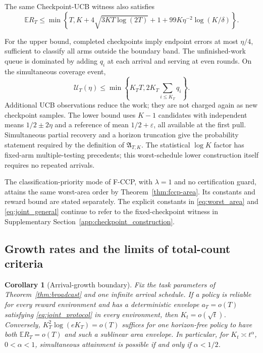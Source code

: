 \documentclass[11pt]{article}
\newtheorem{corollary}[theorem]{Corollary}
\theoremstyle{remark}
\newcommand{\E}{\mathbb E}
\begin{document}
The same Checkpoint-UCB witness also satisfies
\begin{equation}
 \E R_T\le\min\left\{T,K+4\sqrt{3KT\log(2T)}+1+
                         99K\eta^{-2}\log(K/\delta)\right\}.
 \label{eq:joint_general}
\end{equation}


For the upper bound, completed checkpoints imply endpoint errors at most
$\eta/4$, sufficient to classify all arms outside the boundary band. The
unfinished-work queue is dominated by adding $q_i$ at each arrival and serving
at even rounds. On the simultaneous coverage event,
\begin{equation}
 \mathcal U_T(\eta)\le\min\left\{K_TT,
                         2K_T\sum_{i\le K_T}q_i\right\}.
 \label{eq:queue_upper}
\end{equation}
Additional UCB observations reduce the work; they are not charged again as
new checkpoint samples. The lower bound uses $K-1$ candidates with independent
means $1/2\pm2\eta$ and a reference of mean $1/2+\varepsilon$, all available
at the first pull. Simultaneous partial recovery and a horizon truncation give
the probability statement required by the definition of $\mathfrak A_{T,K}$.
The statistical $\log K$ factor has fixed-arm multiple-testing precedents;
this worst-schedule lower construction itself requires no repeated arrivals.

The classification-priority mode of F-CCP, with $\lambda=1$ and no
certification guard, attains the same worst-area order by
Theorem~\ref{thm:fccp-area}. Its constants and reward bound are stated
separately. The explicit constants in \eqref{eq:worst_area} and
\eqref{eq:joint_general} continue to refer to the fixed-checkpoint
witness in Supplementary Section~\ref{app:checkpoint_construction}.

\subsection{Growth rates and the limits of total-count criteria}

\begin{corollary}[Arrival-growth boundary]
\label{cor:growth}
Fix the task parameters of Theorem~\ref{thm:broadcast} and one infinite arrival
schedule. If a policy is reliable for every reward environment and has a
deterministic envelope $a_T=o(T)$ satisfying \eqref{eq:joint_protocol} in
every environment, then $K_t=o(\sqrt t)$. Conversely,
$K_T^2\log(eK_T)=o(T)$ suffices for one horizon-free policy to have both
$\E R_T=o(T)$ and such a sublinear area envelope. In particular, for
$K_t\asymp t^\alpha$, $0<\alpha<1$, simultaneous attainment is possible if
and only if $\alpha<1/2$.
\end{corollary}
\end{document}
